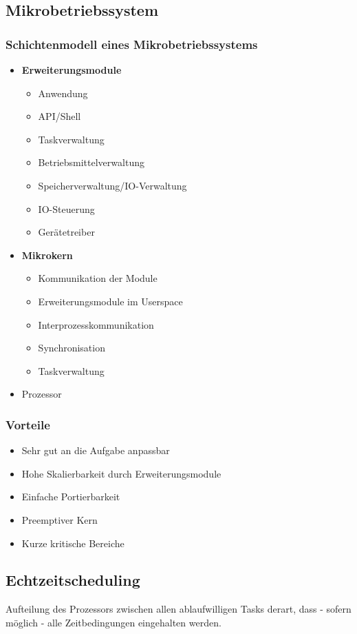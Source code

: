\subsection{Mikrobetriebssystem}

\subsubsection{Schichtenmodell eines Mikrobetriebssystems}
\begin{itemize}
	\item \textbf{Erweiterungsmodule}
	\begin{itemize}
		\item Anwendung
		\item API/Shell
		\item Taskverwaltung
		\item Betriebsmittelverwaltung
		\item Speicherverwaltung/IO-Verwaltung
		\item IO-Steuerung
		\item Gerätetreiber
	\end{itemize}
	\item \textbf{Mikrokern}
	\begin{itemize}
		\item Kommunikation der Module
		\item Erweiterungsmodule im Userspace
		\item Interprozesskommunikation
		\item Synchronisation
		\item Taskverwaltung
	\end{itemize}
	\item Prozessor
\end{itemize}

\subsubsection{Vorteile}
\begin{itemize}
	\item Sehr gut an die Aufgabe anpassbar
	\item Hohe Skalierbarkeit durch Erweiterungsmodule
	\item Einfache Portierbarkeit
	\item Preemptiver Kern
	\item Kurze kritische Bereiche
\end{itemize}


\subsection{Echtzeitscheduling}
Aufteilung des Prozessors zwischen allen ablaufwilligen Tasks derart, dass - sofern möglich - alle Zeitbedingungen eingehalten werden.


